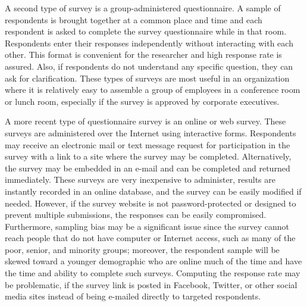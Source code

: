 A second type of survey is a group-administered questionnaire. A sample of respondents is brought together at a common place and time and each respondent is asked to complete the survey questionnaire while in that room. Respondents enter their responses independently without interacting with each other. This format is convenient for the researcher and high response rate is assured. Also, if respondents do not understand any specific question, they can ask for clarification. These types of surveys are most useful in an organization where it is relatively easy to assemble a group of employees in a conference room or lunch room, especially if the survey is approved by corporate executives.

A more recent type of questionnaire survey is an online or web survey. These surveys are administered over the Internet using interactive forms. Respondents may receive an electronic mail or text message request for participation in the survey with a link to a site where the survey may be completed. Alternatively, the survey may be embedded in an e-mail and can be completed and returned immediately. These surveys are very inexpensive to administer, results are instantly recorded in an online database, and the survey can be easily modified if needed. However, if the survey website is not password-protected or designed to prevent multiple submissions, the responses can be easily compromised. Furthermore, sampling bias may be a significant issue since the survey cannot reach people that do not have computer or Internet access, such as many of the poor, senior, and minority groups; moreover, the respondent sample will be skewed toward a younger demographic who are online much of the time and have the time and ability to complete such surveys. Computing the response rate may be problematic, if the survey link is posted in Facebook, Twitter, or other social media sites instead of being e-mailed directly to targeted respondents. 


